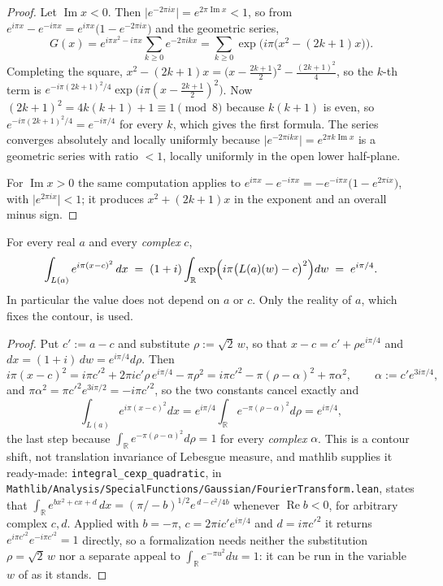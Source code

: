 \begin{proof}
\leanok
Let $\operatorname{Im}x<0$.  Then $\lvert e^{-2\pi ix}\rvert=e^{2\pi\operatorname{Im}x}<1$,
so from $e^{i\pi x}-e^{-i\pi x}=e^{i\pi x}\bigl(1-e^{-2\pi ix}\bigr)$ and the geometric
series,
\[
  G(x)=e^{i\pi x^{2}-i\pi x}\sum_{k\ge0}e^{-2\pi ikx}
      =\sum_{k\ge0}\exp\bigl(i\pi\bigl(x^{2}-(2k+1)x\bigr)\bigr).
\]
Completing the square, $x^{2}-(2k+1)x=\bigl(x-\tfrac{2k+1}2\bigr)^{2}-\tfrac{(2k+1)^{2}}4$,
so the $k$-th term is $e^{-i\pi(2k+1)^{2}/4}\exp\bigl(i\pi(x-\tfrac{2k+1}2)^{2}\bigr)$.
Now $(2k+1)^{2}=4k(k+1)+1\equiv1\pmod 8$ because $k(k+1)$ is even, so
$e^{-i\pi(2k+1)^{2}/4}=e^{-i\pi/4}$ for every $k$, which gives the first formula.  The
series converges absolutely and locally uniformly because
$\lvert e^{-2\pi ikx}\rvert=e^{2\pi k\operatorname{Im}x}$ is a geometric series with ratio
$<1$, locally uniformly in the open lower half-plane.

For $\operatorname{Im}x>0$ the same computation applies to
$e^{i\pi x}-e^{-i\pi x}=-e^{-i\pi x}\bigl(1-e^{2\pi ix}\bigr)$, with
$\lvert e^{2\pi ix}\rvert<1$; it produces $x^{2}+(2k+1)x$ in the exponent and an overall
minus sign.
\end{proof}

\begin{lemma}
\label{lem:rsz_gauss_integral}
\leanok
{}
For every real $a$ and every \emph{complex} $c$,
\[
  \int_{L(a)}e^{i\pi(x-c)^{2}}\,dx
  \;=\;(1+i)\int_{\mathbb{R}}\exp\Bigl(i\pi\bigl(L(a)(w)-c\bigr)^{2}\Bigr)dw
  \;=\;e^{i\pi/4} .
\]
In particular the value does not depend on $a$ or $c$.  Only the reality of $a$, which fixes
the contour, is used.
\end{lemma}

\begin{proof}
\leanok
Put $c':=a-c$ and substitute $\rho:=\sqrt2\,w$, so that
$x-c=c'+\rho e^{i\pi/4}$ and $dx=(1+i)\,dw=e^{i\pi/4}d\rho$.  Then
\[
  i\pi(x-c)^{2}=i\pi c'^{2}+2\pi i c'\rho\,e^{i\pi/4}-\pi\rho^{2}
  =i\pi c'^{2}-\pi(\rho-\alpha)^{2}+\pi\alpha^{2},\qquad \alpha:=c'e^{3i\pi/4},
\]
and $\pi\alpha^{2}=\pi c'^{2}e^{3i\pi/2}=-i\pi c'^{2}$, so the two constants cancel
exactly and
\[
  \int_{L(a)}e^{i\pi(x-c)^{2}}dx=e^{i\pi/4}\int_{\mathbb{R}}e^{-\pi(\rho-\alpha)^{2}}d\rho
  =e^{i\pi/4},
\]
the last step because $\int_{\mathbb{R}}e^{-\pi(\rho-\alpha)^{2}}d\rho=1$ for every
\emph{complex} $\alpha$.  This is a contour shift, not translation invariance of Lebesgue
measure, and mathlib supplies it ready-made: \texttt{integral\_cexp\_quadratic}, in
\texttt{Mathlib/Analysis/SpecialFunctions/Gaussian/FourierTransform.lean}, states that
$\int_{\mathbb{R}}e^{bx^{2}+cx+d}\,dx=(\pi/-b)^{1/2}e^{\,d-c^{2}/4b}$ whenever
$\operatorname{Re}b<0$, for arbitrary complex $c,d$.  Applied with $b=-\pi$,
$c=2\pi ic'e^{i\pi/4}$ and $d=i\pi c'^{2}$ it returns $e^{i\pi c'^{2}}e^{-i\pi c'^{2}}=1$
directly, so a formalization needs neither the substitution $\rho=\sqrt2\,w$ nor a separate
appeal to $\int_{\mathbb{R}}e^{-\pi u^{2}}du=1$: it can be run in the variable $w$ of
 as it stands.
\end{proof}

